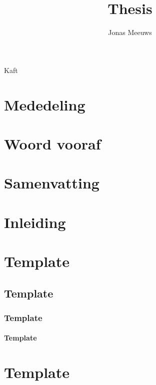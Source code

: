 \documentclass[a4paper]{report}
\title{Thesis}
\author{Jonas Meeuws}
\begin{document}
Kaft

\newpage
\thispagestyle{empty}
\mbox{}

\maketitle
%

\chapter*{Mededeling}
\blindtext

\chapter*{Woord vooraf}
\blindtext

\chapter*{Samenvatting}
\blindtext

\tableofcontents
\newpage

\listoffigures

\chapter*{Inleiding}

\chapter{Template}
\section{Template}
\subsection{Template}
\subsubsection{Template}
\blindtext
\autocite{example}

\chapter{Template}
\end{document}

